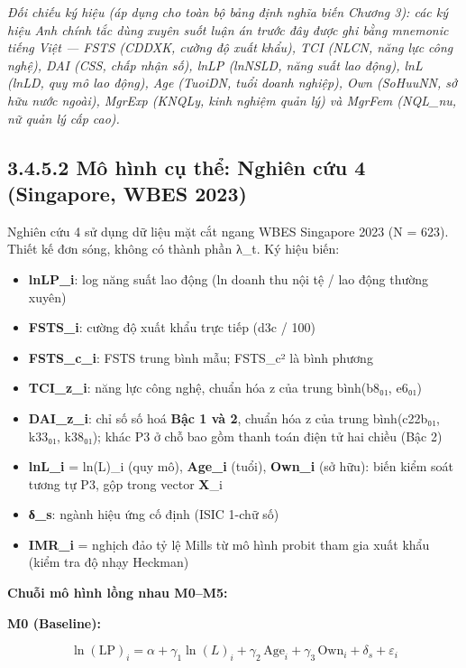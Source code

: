 \documentclass[
  a4paper,
  13pt]{extreport}
\providecommand{\tightlist}{%
  \setlength{\itemsep}{0pt}\setlength{\parskip}{0pt}}
\begin{document}
\emph{Đối chiếu ký hiệu (áp dụng cho toàn bộ bảng định nghĩa biến Chương
3): các ký hiệu Anh chính tắc dùng xuyên suốt luận án trước đây được ghi
bằng mnemonic tiếng Việt --- FSTS (CDDXK, cường độ xuất khẩu), TCI
(NLCN, năng lực công nghệ), DAI (CSS, chấp nhận số), lnLP (lnNSLD, năng
suất lao động), lnL (lnLD, quy mô lao động), Age (TuoiDN, tuổi doanh
nghiệp), Own (SoHuuNN, sở hữu nước ngoài), MgrExp (KNQLy, kinh nghiệm
quản lý) và MgrFem (NQL\_nu, nữ quản lý cấp cao).}

\hypertarget{muxf4-huxecnh-cux1ee5-thux1ec3-nghiuxean-cux1ee9u-4-singapore-wbes-2023}{%
\subsection{3.4.5.2 Mô hình cụ thể: Nghiên cứu 4 (Singapore, WBES
2023)}\label{muxf4-huxecnh-cux1ee5-thux1ec3-nghiuxean-cux1ee9u-4-singapore-wbes-2023}}

Nghiên cứu 4 sử dụng dữ liệu mặt cắt ngang WBES Singapore 2023 (N =
623). Thiết kế đơn sóng, không có thành phần λ\_t. Ký hiệu biến:

\begin{itemize}
\tightlist
\item
  \textbf{lnLP\_i}: log năng suất lao động (ln doanh thu nội tệ / lao
  động thường xuyên)
\item
  \textbf{FSTS\_i}: cường độ xuất khẩu trực tiếp (d3c / 100)
\item
  \textbf{FSTS\_c\_i}: FSTS trung bình mẫu; FSTS\_c² là bình phương
\item
  \textbf{TCI\_z\_i}: năng lực công nghệ, chuẩn hóa z của trung
  bình(b8₀₁, e6₀₁)
\item
  \textbf{DAI\_z\_i}: chỉ số số hoá \textbf{Bậc 1 và 2}, chuẩn hóa z của
  trung bình(c22b₀₁, k33₀₁, k38₀₁); khác P3 ở chỗ bao gồm thanh toán
  điện tử hai chiều (Bậc 2)
\item
  \textbf{lnL\_i} = ln(L)\_i (quy mô), \textbf{Age\_i} (tuổi),
  \textbf{Own\_i} (sở hữu): biến kiểm soát tương tự P3, gộp trong vector
  \textbf{X}\_i
\item
  \textbf{δ\_s}: ngành hiệu ứng cố định (ISIC 1-chữ số)
\item
  \textbf{IMR\_i} = nghịch đảo tỷ lệ Mills từ mô hình probit tham gia
  xuất khẩu (kiểm tra độ nhạy Heckman)
\end{itemize}

\textbf{Chuỗi mô hình lồng nhau M0--M5:}

\textbf{M0 (Baseline):}

\[\ln(\mathrm{LP})_i = \alpha + \gamma_1 \ln(L)_i + \gamma_2\,\mathrm{Age}_i + \gamma_3\,\mathrm{Own}_i + \delta_s + \varepsilon_i\]
\end{document}
